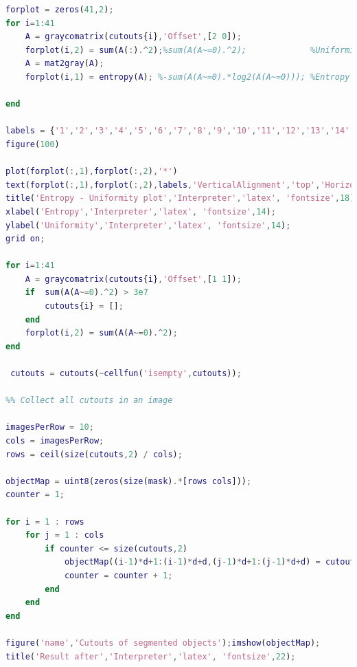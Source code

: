 \documentclass[oneside,a4paper]{article}
\begin{document}
\begin{lstlisting}[language=MATLAB]
% Place for your own texture analysis. 
forplot = zeros(41,2);
for i=1:41    
    A = graycomatrix(cutouts{i},'Offset',[2 0]);
    forplot(i,2) = sum(A(:).^2);%sum(A(A~=0).^2);             %Uniformity
    A = mat2gray(A);
    forplot(i,1) = entropy(A); %-sum(A(A~=0).*log2(A(A~=0))); %Entropy
    
end

labels = {'1','2','3','4','5','6','7','8','9','10','11','12','13','14','15','16','17','18','19','20','21','22','23','24','25','26','27','28','29','30','31','32','33','34','35','36','37','38','39','40','41'};
figure(100)

plot(forplot(:,1),forplot(:,2),'*')
text(forplot(:,1),forplot(:,2),labels,'VerticalAlignment','top','HorizontalAlignment','left', 'FontSize',12)
title('Entropy - Uniformity plot','Interpreter','latex', 'fontsize',18);
xlabel('Entropy','Interpreter','latex', 'fontsize',14);
ylabel('Uniformity','Interpreter','latex', 'fontsize',14);
grid on; 

for i=1:41    
    A = graycomatrix(cutouts{i},'Offset',[1 1]);
    if  sum(A(A~=0).^2) > 3e7
        cutouts{i} = [];
    end
    forplot(i,2) = sum(A(A~=0).^2);
end

 cutouts = cutouts(~cellfun('isempty',cutouts));

%% Collect all cutouts in an image

imagesPerRow = 10;
cols = imagesPerRow;
rows = ceil(size(cutouts,2) / cols);

objectMap = uint8(zeros(size(mask).*[rows cols]));
counter = 1;

for i = 1 : rows
    for j = 1 : cols
        if counter <= size(cutouts,2)
            objectMap((i-1)*d+1:(i-1)*d+d,(j-1)*d+1:(j-1)*d+d) = cutouts{counter}(:,:);
            counter = counter + 1;
        end
    end    
end

figure('name','Cutouts of segmented objects');imshow(objectMap);
title('Result after','Interpreter','latex', 'fontsize',22);

\end{lstlisting}



%
%
%
\end{document}
